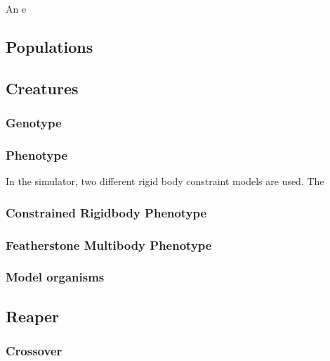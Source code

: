 \documentclass[main]{subfiles}
\begin{document}
An e

\subsection{Populations}

\lipsum[6]

\subsection{Creatures}

\lipsum[7]

\subsubsection{Genotype}

\lipsum[8]

\subsubsection{Phenotype}

\lipsum[9]
In the simulator, two different rigid body constraint models are used. The 

\subsubsection{Constrained Rigidbody Phenotype}

\lipsum[10]

\subsubsection{Featherstone Multibody Phenotype}

\lipsum[11]

\subsubsection{Model organisms}

\lipsum[12]

\subsection{Reaper}

\lipsum[13]

\subsubsection{Crossover}
\end{document}
